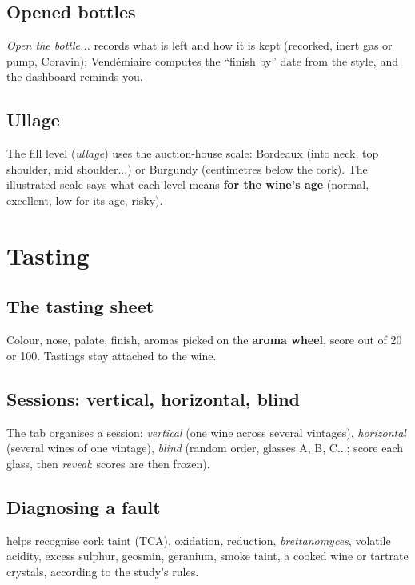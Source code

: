 \documentclass[11pt,a4paper]{article}
\begin{document}
\subsection{Opened bottles}
\emph{Open the bottle...} records what is left and how it is kept (recorked, inert gas or pump, Coravin);
Vendémiaire computes the ``finish by'' date from the style, and the dashboard reminds you.


\subsection{Ullage}
The fill level (\emph{ullage}) uses the auction-house scale: Bordeaux (into neck, top shoulder, mid
shoulder...) or Burgundy (centimetres below the cork). The illustrated scale says what each level means
\textbf{for the wine's age} (normal, excellent, low for its age, risky).


\section{Tasting}
\subsection{The tasting sheet}
Colour, nose, palate, finish, aromas picked on the \textbf{aroma wheel}, score out of 20 or 100. Tastings stay
attached to the wine.


\subsection{Sessions: vertical, horizontal, blind}
The  tab organises a session: \emph{vertical} (one wine across several vintages),
\emph{horizontal} (several wines of one vintage), \emph{blind} (random order, glasses A, B, C...; score each
glass, then \emph{reveal}: scores are then frozen).


\subsection{Diagnosing a fault}
 helps recognise cork taint (TCA), oxidation, reduction,
\emph{brettanomyces}, volatile acidity, excess sulphur, geosmin, geranium, smoke taint, a cooked wine or tartrate
crystals, according to the study's rules.
\end{document}
